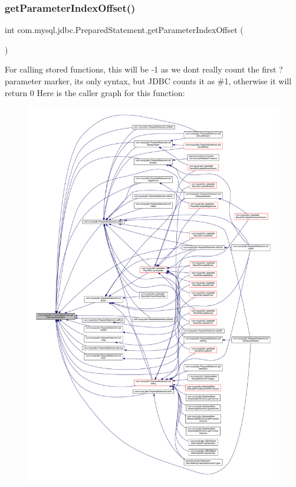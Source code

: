 \subsubsection{\texorpdfstring{get\+Parameter\+Index\+Offset()}{getParameterIndexOffset()}}
{\footnotesize\ttfamily int com.\+mysql.\+jdbc.\+Prepared\+Statement.\+get\+Parameter\+Index\+Offset (\begin{DoxyParamCaption}{ }\end{DoxyParamCaption})\hspace{0.3cm}{\ttfamily [protected]}}

For calling stored functions, this will be -\/1 as we don\textquotesingle{}t really count the first \textquotesingle{}?\textquotesingle{} parameter marker, it\textquotesingle{}s only syntax, but J\+D\+BC counts it as \#1, otherwise it will return 0 Here is the caller graph for this function\+:
\nopagebreak
\begin{figure}[H]
\begin{center}
\leavevmode
\includegraphics[width=350pt]{classcom_1_1mysql_1_1jdbc_1_1_prepared_statement_a80a81c39177a5e46c653efb1acd9e797_icgraph}
\end{center}
\end{figure}
